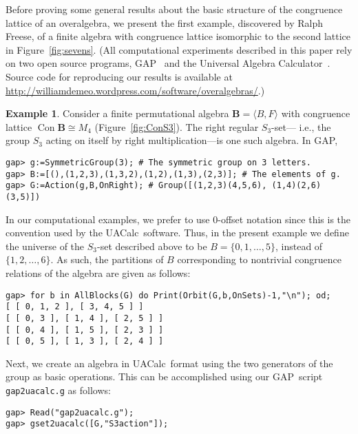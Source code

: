 \documentclass{au}
\numberwithin{equation}{section}
\theoremstyle{plain}
\theoremstyle{definition}
\newtheorem{example}[theorem]{Example}
\newcommand{\uacalc}{{\small UAC}alc} %
\newcommand{\<}{\ensuremath{\langle}}
\renewcommand{\>}{\ensuremath{\rangle}}
\newcommand{\bB}{\ensuremath{\mathbf{B}}}
\DeclareMathOperator{\Con}{Con}
\newcommand{\GAP}{{\small GAP}} %
\begin{document}
Before proving some general results about the basic structure of the
congruence lattice of an overalgebra, we present the first example,
discovered by Ralph Freese, of a finite algebra with congruence lattice
isomorphic to the second lattice in  Figure~\ref{fig:sevens}.
(All computational experiments described in this paper rely on
two open source programs, GAP~\cite{GAP4} and the Universal Algebra
Calculator~\cite{uacalc}. Source code for reproducing our results is
available at \url{http://williamdemeo.wordpress.com/software/overalgebras/}.)
\begin{example}
\label{ex:3.1}
Consider a finite permutational algebra $\bB = \<B, F\>$
with congruence lattice $\Con\bB \cong M_4$ (Figure~\ref{fig:ConS3}).
The right regular $S_3$-set---%
i.e., the group $S_3$
acting on itself by right multiplication---is one such algebra.  In
\GAP,
\begin{small}
\begin{verbatim}
gap> g:=SymmetricGroup(3); # The symmetric group on 3 letters.
gap> B:=[(),(1,2,3),(1,3,2),(1,2),(1,3),(2,3)]; # The elements of g.
gap> G:=Action(g,B,OnRight); # Group([(1,2,3)(4,5,6), (1,4)(2,6)(3,5)])
\end{verbatim}
\end{small}

In our computational examples, we prefer to use 0-offset notation since this is
the convention used by the \uacalc\ software.  Thus, in the present example we define
the universe of the $S_3$-set described above to be
$B = \{0, 1,\dots, 5\}$, instead of $\{1, 2, \dots, 6\}$.
As such, the partitions of $B$ corresponding to nontrivial congruence relations
of the algebra are given as follows:

\begin{small}
\begin{verbatim}
gap> for b in AllBlocks(G) do Print(Orbit(G,b,OnSets)-1,"\n"); od;
[ [ 0, 1, 2 ], [ 3, 4, 5 ] ]
[ [ 0, 3 ], [ 1, 4 ], [ 2, 5 ] ]
[ [ 0, 4 ], [ 1, 5 ], [ 2, 3 ] ]
[ [ 0, 5 ], [ 1, 3 ], [ 2, 4 ] ]
\end{verbatim}
\end{small}

\noindent %
Next, we create an algebra
in \uacalc\ format using the two generators of the
 group as basic operations.  This can be accomplished using
our \GAP\ script {\tt gap2uacalc.g} as follows:

\begin{small}
\begin{verbatim}
gap> Read("gap2uacalc.g");
gap> gset2uacalc([G,"S3action"]);
\end{verbatim}
\end{small}


\end{example}
\end{document}

